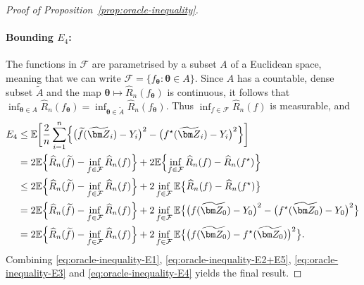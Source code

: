 \documentclass[12pt]{article}
\def\hat{\widehat}
\def\tilde{\widetilde}
\begin{document}
\begin{proof}[Proof of Proposition~\ref{prop:oracle-inequality}]
    \paragraph{Bounding $E_4$:} The functions in $\mathcal{F}$ are parametrised by a subset $A$ of a Euclidean space, meaning that we can write $\mathcal{F} = \{f_{\bm\theta}: \bm\theta \in A\}$.  Since $A$ has a countable, dense subset $\tilde A$ \citep[e.g.][Proposition~9.26]{royden2010real} and the map $\bm\theta \mapsto \hat{R}_n(f_{\bm\theta})$ is continuous, it follows that $\inf_{\bm \theta \in A} \hat{R}_n(f_{\bm \theta}) = \inf_{\bm \theta \in \tilde{A}} \hat{R}_n(f_{\bm \theta})$.  Thus $\inf_{f \in \mathcal{F}} \hat{R}_n(f)$ is measurable, and
    \begin{align}
        E_4 &\leq \mathbb{E}\biggl[ \frac{2}{n} \sum_{i=1}^n \Bigl\{ \bigl(\tilde{f}(\tilde{\bm Z}_i) - Y_i\bigr)^2 - \bigl(f^{\star}(\tilde{\bm Z}_i) - Y_i\bigr)^2 \Bigr\} \biggr] \nonumber\\
        &= 2\mathbb{E}\Bigl\{\hat R_n(\tilde f) - \inf_{f\in\mathcal{F}}\hat{R}_n(f) \Bigr\} + 2\mathbb{E} \Bigl\{\inf_{f\in\mathcal{F}}\hat{R}_n(f) - \hat{R}_n(f^{\star}) \Bigr\}\nonumber\\
        &\leq 2\mathbb{E}\Bigl\{\hat R_n(\tilde f) - \inf_{f\in\mathcal{F}}\hat{R}_n(f) \Bigr\} + 2\inf_{f\in\mathcal{F}} \mathbb{E} \bigl\{\hat{R}_n(f) - \hat{R}_n(f^{\star}) \bigr\}\nonumber\\
        &= 2\mathbb{E}\Bigl\{\hat R_n(\tilde f) - \inf_{f\in\mathcal{F}}\hat{R}_n(f) \Bigr\} + 2\inf_{f\in\mathcal{F}} \mathbb{E} \bigl\{\bigl(f(\tilde{\bm Z_0}) - Y_0\bigr)^2 - \bigl(f^{\star}(\tilde{\bm Z_0}) - Y_0\bigr)^2 \bigr\}\nonumber\\
        &= 2\mathbb{E}\Bigl\{\hat R_n(\tilde f) - \inf_{f\in\mathcal{F}}\hat{R}_n(f) \Bigr\} + 2\inf_{f\in\mathcal{F}} \mathbb{E} \bigl\{\bigl(f(\tilde{\bm Z_0}) - f^{\star}(\tilde{\bm Z_0})\bigr)^2 \bigr\}. \label{eq:oracle-inequality-E4}
    \end{align}
    Combining \eqref{eq:oracle-inequality-E1}, \eqref{eq:oracle-inequality-E2+E5}, \eqref{eq:oracle-inequality-E3} and \eqref{eq:oracle-inequality-E4} yields the final result.

\end{proof}
\end{document}
